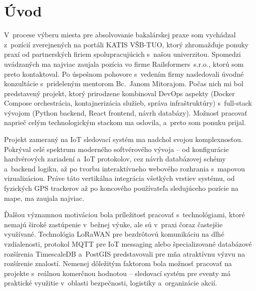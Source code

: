 \chapter*{Úvod}
\label{sec:Uvod}



V~procese výberu miesta pre absolvovanie bakalárskej praxe som vychádzal z~pozícií zverejnených na portáli KATIS VŠB-TUO, ktorý zhromažďuje ponuky praxí od partnerských firiem spolupracujúcich s~našou univerzitou. Spomedzi uvádzaných ma najviac zaujala pozícia vo firme Railsformers~s.r.o., ktorú som preto kontaktoval. Po úspešnom pohovore s~vedením firmy nasledovali úvodné konzultácie s~prideleným mentorom Bc.~Janom Mitorajom. Počas nich mi bol predstavený projekt, ktorý prirodzene kombinoval DevOps aspekty (Docker Compose orchestrácia, kontajnerizácia služieb, správa infraštruktúry) s~full-stack vývojom (Python backend, React frontend, návrh databázy). Možnosť pracovať naprieč celým technologickým stackom ma oslovila, a~preto som ponuku prijal.

Projekt zameraný na IoT sledovací systém ma nadchol svojou komplexnosťou. Pokrýval celé spektrum moderného softvérového vývoja -- od konfigurácie hardvérových zariadení a~IoT protokolov, cez návrh databázovej schémy a~backend logiku, až po tvorbu interaktívneho webového rozhrania s~mapovou vizualizáciou. Práve táto vertikálna integrácia všetkých vrstiev systému, od fyzických GPS trackerov až po koncového používateľa sledujúceho pozície na mape, ma zaujala najviac.

Ďalšou významnou motiváciou bola príležitosť pracovať s~technológiami, ktoré nemajú široké zastúpenie v~bežnej výuke, ale sú v~praxi čoraz častejšie využívané. Technológia LoRaWAN pre bezdrôtovú komunikáciu na dlhé vzdialenosti, protokol MQTT pre IoT messaging alebo špecializované databázové rozšírenia TimescaleDB a~PostGIS predstavovali pre mňa atraktívnu výzvu na rozšírenie znalostí. Nemenej dôležitým faktorom bola možnosť pracovať na projekte s~reálnou komerčnou hodnotou -- sledovací systém pre eventy má praktické využitie v~oblasti bezpečnosti, logistiky a~organizácie akcií.


